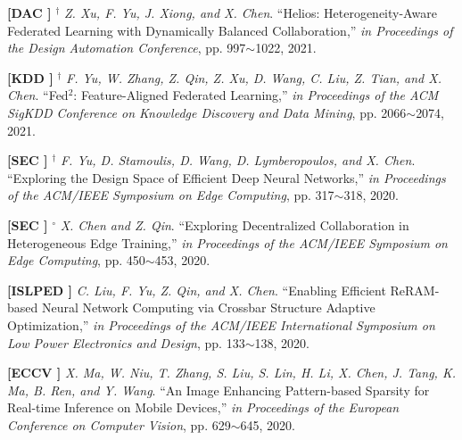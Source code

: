 	\textbf{[DAC ]}
	$^\dagger$
	\textsl{Z. Xu, F. Yu, J. Xiong, and X. Chen}.
		``Helios: Heterogeneity-Aware Federated Learning with Dynamically Balanced Collaboration,''
		\textsl{in Proceedings of the Design Automation Conference},  pp. 997$\sim$1022, 2021.
			\vspace{-3mm}

	\textbf{[KDD ]}
	$^\dagger$
	\textsl{F. Yu, W. Zhang, Z. Qin, Z. Xu, D. Wang, C. Liu, Z. Tian, and X. Chen}.
		``Fed$^2$: Feature-Aligned Federated Learning,''
		\textsl{in Proceedings of the ACM SigKDD Conference on Knowledge Discovery and Data Mining}, pp. 2066$\sim$2074, 2021.
			\vspace{-3mm}

	\textbf{[SEC ]}
	$^\dagger$
	\textsl{F. Yu, D. Stamoulis, D. Wang, D. Lymberopoulos, and X. Chen}.
		``Exploring the Design Space of Efficient Deep Neural Networks,''
		\textsl{in Proceedings of the ACM/IEEE Symposium on Edge Computing},  pp. 317$\sim$318, 2020.
			\vspace{-3mm}


	\textbf{[SEC ]}
	$^\circ$
	\textsl{X. Chen and Z. Qin}.
		``Exploring Decentralized Collaboration in Heterogeneous Edge Training,''
		\textsl{in Proceedings of the ACM/IEEE Symposium on Edge Computing},  pp. 450$\sim$453, 2020.
			\vspace{-3mm}

	\textbf{[ISLPED ]}\hspace{2mm}
	\textsl{C. Liu, F. Yu, Z. Qin, and X. Chen}.
		``Enabling Efficient ReRAM-based Neural Network Computing via Crossbar Structure Adaptive Optimization,''
		\textsl{in Proceedings of the ACM/IEEE International Symposium on Low Power Electronics and Design}, pp. 133$\sim$138, 2020.
			\vspace{-3mm}

	\textbf{[ECCV ]}\hspace{2mm}
	\textsl{X. Ma, W. Niu, T. Zhang, S. Liu, S. Lin, H. Li, X. Chen, J. Tang, K. Ma, B. Ren, and Y. Wang}.
		``An Image Enhancing Pattern-based Sparsity for Real-time Inference on Mobile Devices,''
		\textsl{in Proceedings of the European Conference on Computer Vision}, pp. 629$\sim$645,  2020.
			\vspace{-3mm}


